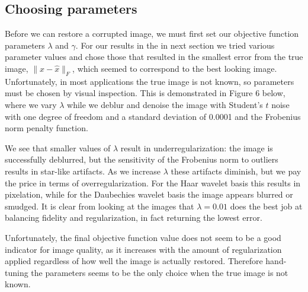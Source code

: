 \documentclass[10pt,a4paper]{article}
\begin{document}
	\newpage
	\subsection{Choosing parameters}
	Before we can restore a corrupted image, we must first set our objective function parameters $\lambda$ and $\gamma$. For our results in the in next section we tried various parameter values and chose those that resulted in the smallest error from the true image, $\| x - \hat x \|_F$, which seemed to correspond to the best looking image. Unfortunately, in most applications the true image is not known, so parameters must be chosen by visual inspection. This is demonstrated in Figure 6 below, where we vary $\lambda$ while we deblur and denoise the image with Student's $t$ noise with one degree of freedom and a standard deviation of 0.0001 and the Frobenius norm penalty function. 
	
	We see that smaller values of $\lambda$ result in underregularization: the image is successfully deblurred, but the sensitivity of the Frobenius norm to outliers results in star-like artifacts. As we increase $\lambda$ these artifacts diminish, but we pay the price in terms of overregularization. For the Haar wavelet basis this results in pixelation, while for the Daubechies wavelet basis the image appears blurred or smudged. It is clear from looking at the images that $\lambda = 0.01$ does the best job at balancing fidelity and regularization, in fact returning the lowest error. 
	
	Unfortunately, the final objective function value does not seem to be a good indicator for image quality, as it increases with the amount of regularization applied regardless of how well the image is actually restored. Therefore hand-tuning the parameters seems to be the only choice when the true image is not known.  \\
	
\end{document}
